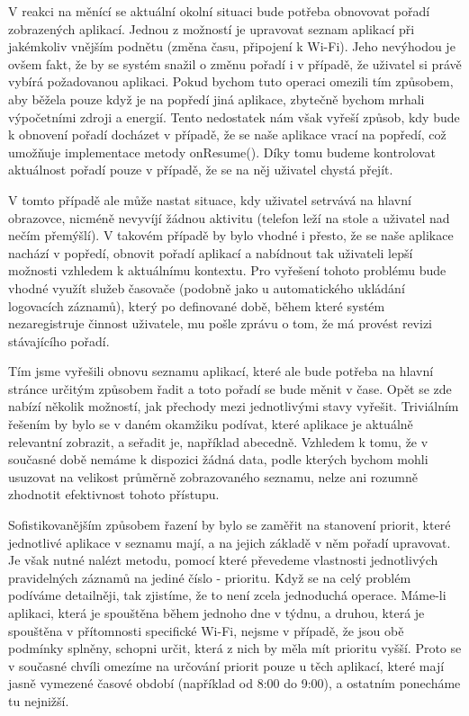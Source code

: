 \documentclass[thesis=M,czech]{FITthesis}[2012/06/26]
\begin{document}
V reakci na měnící se aktuální okolní situaci bude potřeba obnovovat pořadí zobrazených aplikací. Jednou z možností je upravovat seznam aplikací při jakémkoliv vnějším podnětu (změna času, připojení k Wi-Fi). Jeho nevýhodou je ovšem fakt, že by se systém snažil o změnu pořadí i v případě, že uživatel si právě vybírá požadovanou aplikaci. Pokud bychom tuto operaci omezili tím způsobem, aby běžela pouze když je na popředí jiná aplikace, zbytečně bychom mrhali výpočetními zdroji a energií. Tento nedostatek nám však vyřeší způsob, kdy bude k obnovení pořadí docházet v případě, že se naše aplikace vrací na popředí, což umožňuje implementace metody onResume(). Díky tomu budeme kontrolovat aktuálnost pořadí pouze v případě, že se na něj uživatel chystá přejít.

V tomto případě ale může nastat situace, kdy uživatel setrvává na hlavní obrazovce, nicméně nevyvíjí žádnou aktivitu (telefon leží na stole a uživatel nad nečím přemýšlí). V takovém případě by bylo vhodné i přesto, že se naše aplikace nachází v popředí, obnovit pořadí aplikací a nabídnout tak uživateli lepší možnosti vzhledem k aktuálnímu kontextu. Pro vyřešení tohoto problému bude vhodné využít služeb časovače (podobně jako u automatického ukládání logovacích záznamů), který po definované době, během které systém nezaregistruje činnost uživatele, mu pošle zprávu o tom, že má provést revizi stávajícího pořadí.

Tím jsme vyřešili obnovu seznamu aplikací, které ale bude potřeba na hlavní stránce určitým způsobem řadit a toto pořadí se bude měnit v čase. Opět se zde nabízí několik možností, jak přechody mezi jednotlivými stavy vyřešit. Triviálním řešením by bylo se v daném okamžiku podívat, které aplikace je aktuálně relevantní zobrazit, a seřadit je, například abecedně. Vzhledem k tomu, že v současné době nemáme k dispozici žádná data, podle kterých bychom mohli usuzovat na velikost průměrně zobrazovaného seznamu, nelze ani rozumně zhodnotit efektivnost tohoto přístupu.

Sofistikovanějším způsobem řazení by bylo se zaměřit na stanovení priorit, které jednotlivé aplikace v seznamu mají, a na jejich základě v něm pořadí upravovat. Je však nutné nalézt metodu, pomocí které převedeme vlastnosti jednotlivých pravidelných záznamů na jediné číslo - prioritu. Když se na celý problém podíváme detailněji, tak zjistíme, že to není zcela jednoduchá operace. Máme-li aplikaci, která je spouštěna během jednoho dne v týdnu, a druhou, která je spouštěna v přítomnosti specifické Wi-Fi, nejsme v případě, že jsou obě podmínky splněny, schopni určit, která z nich by měla mít prioritu vyšší. Proto se v současné chvíli omezíme na určování priorit pouze u těch aplikací, které mají jasně vymezené časové období (například od 8:00 do 9:00), a ostatním ponecháme tu nejnižší.
\end{document}
